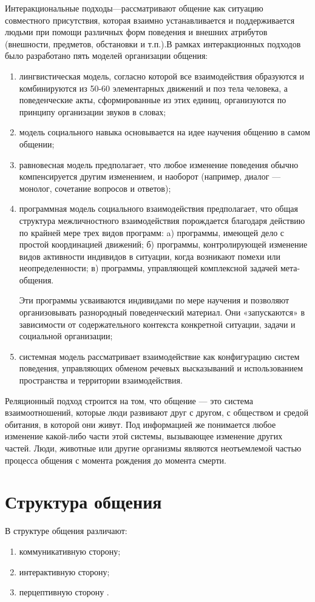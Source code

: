 Интеракциональные подходы—рассматривают общение как ситуацию совместного присутствия, которая взаимно устанавливается и поддерживается людьми при помощи различных форм поведения и внешних атрибутов (внешности, предметов, обстановки и т.п.).В рамках интеракционных подходов было разработано пять моделей организации общения:
\begin{enumerate}
	\item лингвистическая модель, согласно которой все взаимодействия образуются и комбинируются из 50-60 элементарных движений и поз тела человека, а поведенческие акты, сформированные из этих единиц, организуются по принципу организации звуков в словах;
	\item модель социального навыка основывается на идее научения общению в самом общении;
	\item равновесная модель предполагает, что любое изменение поведения обычно компенсируется другим изменением, и наоборот (например, диалог — монолог, сочетание вопросов и ответов);
	\item программная модель социального взаимодействия предполагает, что общая структура межличностного взаимодействия порождается благодаря действию по крайней мере трех видов программ:
		\subitem a) программы, имеющей дело с простой координацией движений;
		\subitem б) программы, контролирующей изменение видов активности индивидов в ситуации, когда возникают помехи или неопределенности;
		\subitem в) программы, управляющей комплексной задачей мета-общения.
		
	Эти программы усваиваются индивидами по мере научения и позволяют организовывать разнородный поведенческий материал. Они «запускаются» в зависимости от содержательного контекста конкретной ситуации, задачи и социальной организации;
	\item системная модель рассматривает взаимодействие как конфигурацию систем поведения, управляющих обменом речевых высказываний и использованием пространства и территории взаимодействия.
\end{enumerate}

Реляционный подход строится на том, что общение — это система взаимоотношений, которые люди развивают друг с другом, с обществом и средой обитания, в которой они живут. Под информацией же понимается любое изменение какой-либо части этой системы, вызывающее изменение других частей. Люди, животные или другие организмы являются неотъемлемой частью процесса общения с момента рождения до момента смерти.

\section{Структура общения}
В структуре общения различают: 
\begin{enumerate}
	\item коммуникативную сторону;
	\item интерактивную сторону;
	\item перцептивную сторону \cite{28}.
\end{enumerate}

